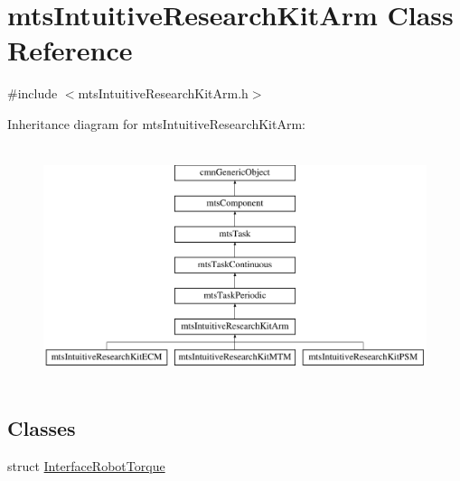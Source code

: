 \hypertarget{classmts_intuitive_research_kit_arm}{\section{mts\-Intuitive\-Research\-Kit\-Arm Class Reference}
\label{classmts_intuitive_research_kit_arm}
}


{\ttfamily \#include $<$mts\-Intuitive\-Research\-Kit\-Arm.\-h$>$}

Inheritance diagram for mts\-Intuitive\-Research\-Kit\-Arm\-:\begin{figure}[H]
\begin{center}
\leavevmode
\includegraphics[height=7.000000cm]{d8/dcf/classmts_intuitive_research_kit_arm}
\end{center}
\end{figure}
\subsection*{Classes}
\begin{DoxyCompactItemize}
\item 
struct \hyperlink{structmts_intuitive_research_kit_arm_1_1_interface_robot_torque}{Interface\-Robot\-Torque}
\end{DoxyCompactItemize}
